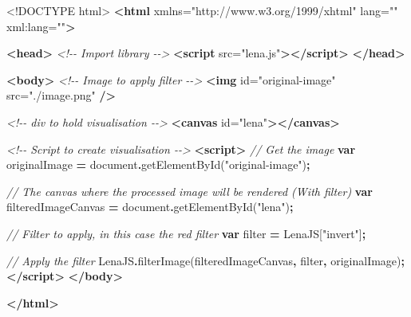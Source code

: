 \documentclass[
]{krantz}
\makeatletter
\newenvironment{Shaded}{\begin{snugshade}}{\end{snugshade}}
\newcommand{\BuiltInTok}[1]{#1}
\newcommand{\CommentTok}[1]{\textcolor[rgb]{0.37,0.37,0.37}{\textit{#1}}}
\newcommand{\DataTypeTok}[1]{\textcolor[rgb]{0.27,0.27,0.27}{#1}}
\newcommand{\FunctionTok}[1]{\textcolor[rgb]{0,0,0}{#1}}
\newcommand{\KeywordTok}[1]{\textcolor[rgb]{0.27,0.27,0.27}{\textbf{#1}}}
\newcommand{\NormalTok}[1]{#1}
\newcommand{\OperatorTok}[1]{\textcolor[rgb]{0.43,0.43,0.43}{\textbf{#1}}}
\newcommand{\OtherTok}[1]{\textcolor[rgb]{0.37,0.37,0.37}{#1}}
\newcommand{\StringTok}[1]{\textcolor[rgb]{0.5,0.5,0.5}{#1}}
\newenvironment{kframe}{%
\medskip{}
\setlength{\fboxsep}{.8em}
 \def\at@end@of@kframe{}%
 \ifinner\ifhmode%
  \def\at@end@of@kframe{\end{minipage}}%
  \begin{minipage}{\columnwidth}%
 \fi\fi%
 \def\FrameCommand##1{\hskip\@totalleftmargin \hskip-\fboxsep
 \colorbox{shadecolor}{##1}\hskip-\fboxsep
     \hskip-\linewidth \hskip-\@totalleftmargin \hskip\columnwidth}%
 \MakeFramed {\advance\hsize-\width
   \@totalleftmargin\z@ \linewidth\hsize
   \@setminipage}}%
 {\par\unskip\endMakeFramed%
 \at@end@of@kframe}
\renewenvironment{Shaded}{\begin{kframe}}{\end{kframe}}
\makeatother
\begin{document}
\begin{Shaded}
\begin{Highlighting}[]
\DataTypeTok{\textless{}!DOCTYPE }\NormalTok{html}\DataTypeTok{\textgreater{}}
\KeywordTok{\textless{}html}\OtherTok{ xmlns=}\StringTok{"http://www.w3.org/1999/xhtml"}\OtherTok{ lang=}\StringTok{""}\OtherTok{ xml:lang=}\StringTok{""}\KeywordTok{\textgreater{}}

\KeywordTok{\textless{}head\textgreater{}}
  \CommentTok{\textless{}!{-}{-} Import library {-}{-}\textgreater{}}
  \KeywordTok{\textless{}script}\OtherTok{ src=}\StringTok{"lena.js"}\KeywordTok{\textgreater{}\textless{}/script\textgreater{}}
\KeywordTok{\textless{}/head\textgreater{}}

\KeywordTok{\textless{}body\textgreater{}}
  \CommentTok{\textless{}!{-}{-} Image to apply filter {-}{-}\textgreater{}}
  \KeywordTok{\textless{}img}\OtherTok{ id=}\StringTok{"original{-}image"}\OtherTok{ src=}\StringTok{"./image.png"} \KeywordTok{/\textgreater{}}

  \CommentTok{\textless{}!{-}{-} div to hold visualisation {-}{-}\textgreater{}}
  \KeywordTok{\textless{}canvas}\OtherTok{ id=}\StringTok{"lena"}\KeywordTok{\textgreater{}\textless{}/canvas\textgreater{}}

  \CommentTok{\textless{}!{-}{-} Script to create visualisation {-}{-}\textgreater{}}
  \KeywordTok{\textless{}script\textgreater{}}
    \CommentTok{// Get the image}
    \KeywordTok{var}\NormalTok{ originalImage }\OperatorTok{=} \BuiltInTok{document}\OperatorTok{.}\FunctionTok{getElementById}\NormalTok{(}\StringTok{"original{-}image"}\NormalTok{)}\OperatorTok{;}

    \CommentTok{// The canvas where the processed image will be rendered (With filter)}
    \KeywordTok{var}\NormalTok{ filteredImageCanvas }\OperatorTok{=} \BuiltInTok{document}\OperatorTok{.}\FunctionTok{getElementById}\NormalTok{(}\StringTok{"lena"}\NormalTok{)}\OperatorTok{;}

    \CommentTok{// Filter to apply, in this case the red filter}
    \KeywordTok{var}\NormalTok{ filter }\OperatorTok{=}\NormalTok{ LenaJS[}\StringTok{"invert"}\NormalTok{]}\OperatorTok{;}

    \CommentTok{// Apply the filter}
\NormalTok{    LenaJS}\OperatorTok{.}\FunctionTok{filterImage}\NormalTok{(filteredImageCanvas}\OperatorTok{,}\NormalTok{ filter}\OperatorTok{,}\NormalTok{ originalImage)}\OperatorTok{;}
  \KeywordTok{\textless{}/script\textgreater{}}
\KeywordTok{\textless{}/body\textgreater{}}

\KeywordTok{\textless{}/html\textgreater{}}
\end{Highlighting}
\end{Shaded}
\end{document}
